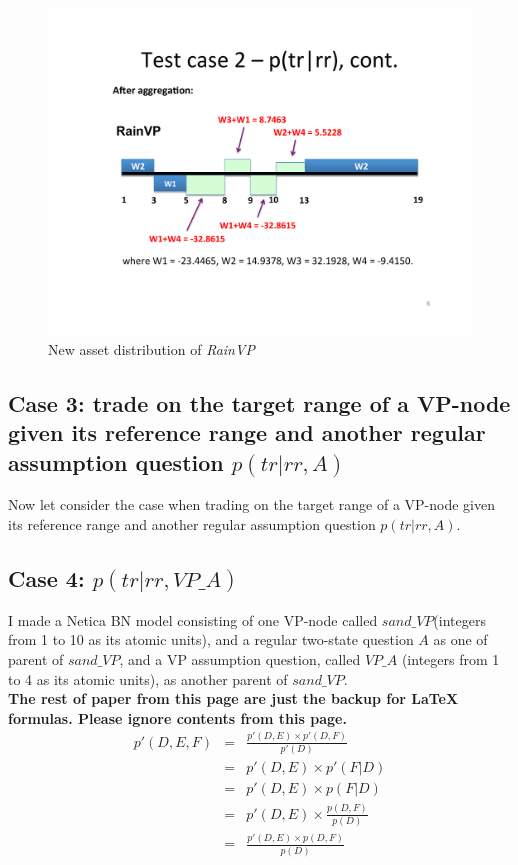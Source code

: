 \documentclass[onecolumn]{article}
\begin{document}
\begin{figure}[tbh]
    \centering    
    \includegraphics[scale=0.65]{DAC_VP_figure/assetchange2_rainVP.pdf}     
    \caption{New asset distribution of \textit{RainVP}} 
    \label{fig:assetchange2} 
\end{figure}

\subsection{Case 3: trade on the target range of a VP-node given its reference range and another regular assumption question $p(tr|rr, A)$}
Now let consider the case when trading on the target range of a VP-node given its reference range and another regular assumption question $p(tr|rr, A)$. 


\subsection{Case 4: $p(tr|rr, VP\_A)$}
I made a Netica BN model consisting of one VP-node called $sand\_VP$(integers from 1 to 10 as its atomic units), and a regular two-state question $A$ as one of parent of $sand\_VP$, and a VP assumption question, called $VP\_A$ (integers from 1 to 4 as its atomic units), as another parent of $sand\_VP$. \\[2pt]


\newpage
\textbf{The rest of paper from this page are just the backup for LaTeX formulas. Please ignore contents from this page.}
\begin{eqnarray*} \label{eqn_pfactor}
 p'(D,E,F) &=& \frac{p'(D,E) \times p'(D,F)}{p'(D)} \\
              &=& p'(D,E) \times p'(F|D) \\
              &=& p'(D,E) \times p(F|D) \\
              &=& p'(D,E) \times \frac{p(D,F)}{p(D)} \\
              &=& \frac{p'(D,E) \times p(D,F)}{p(D)} 
\end{eqnarray*} 
\end{document}
